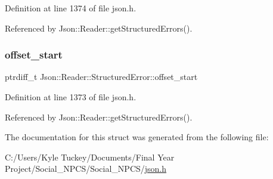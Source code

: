 Definition at line 1374 of file json.\+h.



Referenced by Json\+::\+Reader\+::get\+Structured\+Errors().

\mbox{\label{struct_json_1_1_reader_1_1_structured_error_ac98af0da2d704be4b64a9572a682423b}} 
\subsubsection{\texorpdfstring{offset\+\_\+start}{offset\_start}}
{\footnotesize\ttfamily ptrdiff\+\_\+t Json\+::\+Reader\+::\+Structured\+Error\+::offset\+\_\+start}



Definition at line 1373 of file json.\+h.



Referenced by Json\+::\+Reader\+::get\+Structured\+Errors().



The documentation for this struct was generated from the following file\+:\begin{DoxyCompactItemize}
\item 
C\+:/\+Users/\+Kyle Tuckey/\+Documents/\+Final Year Project/\+Social\+\_\+\+N\+P\+C\+S/\+Social\+\_\+\+N\+P\+C\+S/\hyperlink{json_8h}{json.\+h}\end{DoxyCompactItemize}
